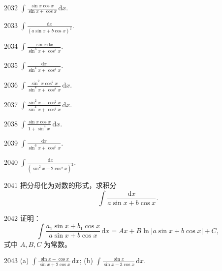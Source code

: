 \begin{prob}[S]{2032}
$\int \frac{\sin x \cos x}{\sin x + \cos x}\,\mathrm{d}x$.
\end{prob}

\begin{prob}[S]{2033}
$\int \frac{\mathrm{d}x}{(a\sin x + b\cos x)^2}$.
\end{prob}

\begin{prob}[S]{2034}
$\int \frac{\sin x \,\mathrm{d}x}{\sin^3 x + \cos^3 x}$.
\end{prob}

\begin{prob}[S]{2035}
$\int \frac{\mathrm{d}x}{\sin^4 x + \cos^4 x}$.
\end{prob}

\begin{prob}[S]{2036}
$\int \frac{\sin^2 x \cos^2 x}{\sin^8 x + \cos^8 x}\,\mathrm{d}x$.
\end{prob}

\begin{prob}[S]{2037}
$\int \frac{\sin^2 x - \cos^2 x}{\sin^4 x + \cos^4 x}\,\mathrm{d}x$.
\end{prob}

\begin{prob}[S]{2038}
$\int \frac{\sin x \cos x}{1 + \sin^4 x}\,\mathrm{d}x$.
\end{prob}

\begin{prob}[S]{2039}
$\int \frac{\mathrm{d}x}{\sin^6 x + \cos^6 x}$.
\end{prob}

\begin{prob}[S]{2040}
$\int \frac{\mathrm{d}x}{(\sin^2 x + 2\cos^2 x)^2}$.
\end{prob}

\begin{prob}[S]{2041}
把分母化为对数的形式，求积分
\[
\int \frac{\mathrm{d}x}{a\sin x + b\cos x}.
\]
\end{prob}

\begin{prob}[M]{2042}
证明：
\[
\int \frac{a_1 \sin x + b_1 \cos x}{a\sin x + b\cos x}\,\mathrm{d}x = Ax + B\ln |a\sin x + b\cos x| + C,
\]
式中 $A, B, C$ 为常数。
\end{prob}


\begin{prob}[M]{2043}
(a) $\int \frac{\sin x - \cos x}{\sin x + 2\cos x}\,\mathrm{d}x$; \qquad (b) $\int \frac{\sin x}{\sin x - 3\cos x}\,\mathrm{d}x$.
\end{prob}

